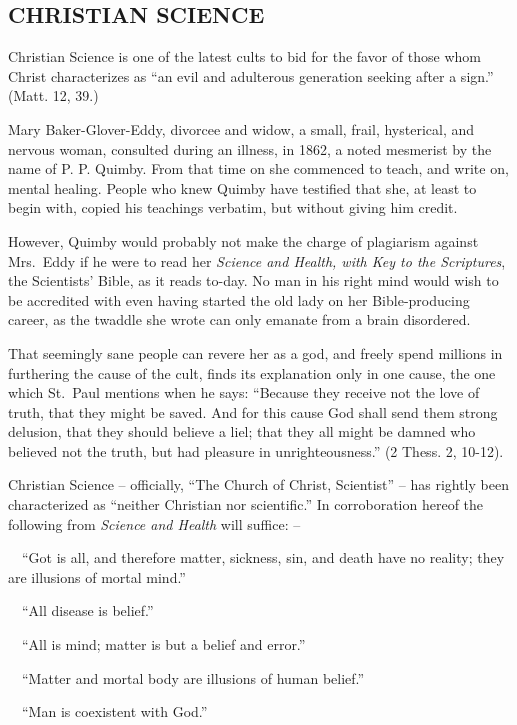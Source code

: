 \documentclass[
]{book}
\begin{document}
\subsection{CHRISTIAN SCIENCE}\label{christian-science}

Christian Science is one of the latest cults to bid for the favor of those whom Christ characterizes as ``an evil and adulterous generation seeking after a sign.'' (Matt. 12, 39.)

Mary Baker-Glover-Eddy, divorcee and widow, a small, frail, hysterical, and nervous woman, consulted during an illness, in 1862, a noted mesmerist by the name of P. P. Quimby. From that time on she commenced to teach, and write on, mental healing. People who knew Quimby have testified that she, at least to begin with, copied his teachings verbatim, but without giving him credit.

However, Quimby would probably not make the charge of plagiarism against Mrs.~Eddy if he were to read her \emph{Science and Health, with Key to the Scriptures}, the Scientists' Bible, as it reads to-day. No man in his right mind would wish to be accredited with even having started the old lady on her Bible-producing career, as the twaddle she wrote can only emanate from a brain disordered.

That seemingly sane people can revere her as a god, and freely spend millions in furthering the cause of the cult, finds its explanation only in one cause, the one which St.~Paul mentions when he says: ``Because they receive not the love of truth, that they might be saved. And for this cause God shall send them strong delusion, that they should believe a liel; that they all might be damned who believed not the truth, but had pleasure in unrighteousness.'' (2 Thess. 2, 10-12).

Christian Science -- officially, ``The Church of Christ, Scientist'' -- has rightly been characterized as ``neither Christian nor scientific.'' In corroboration hereof the following from \emph{Science and Health} will suffice: --

~~``Got is all, and therefore matter, sickness, sin, and death have no reality; they are illusions of mortal mind.''

~~``All disease is belief.''

~~``All is mind; matter is but a belief and error.''

~~``Matter and mortal body are illusions of human belief.''

~~``Man is coexistent with God.''
\end{document}
